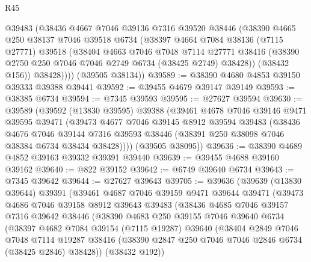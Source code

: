 \begin{lexlean}{R45}
\begin{coremodule}
{          @39483
          (@38436
            @4667
            @7046
            @39136
            @7316
            @39520
            @38446
            (@38390
              @4665
              @250
              @38137
              @7046
              @39518
              @6734
              (@38397
                @4664
                @7084
                @38136
                (@7115 @27771)
                @39518
                (@38404
                  @4663
                  @7046
                  @7048
                  @7114
                  @27771
                  @38416
                  (@38390 @2750 @250 @7046 @7046 @2749 @6734 (@38425 @2749) @38428))
                (@38432 @156))
              @38428))))
      (@39505 @38134))
@39589 := @38390 @4680 @4853 @39150 @39333 @39388 @39441
@39592 := @39455 @4679 @39147 @39149
@39593 := @38385 @6734
@39594 := @7345 @39593
@39595 := @27627 @39594
@39630 := @39589
    (@39592
      (@13830 @39595)
      @39388
      (@39461
        @4678
        @7046
        @39146
        @9471
        @39595
        @39471
        (@39473
          @4677
          @7046
          @39145
          @8912
          @39594
          @39483
          (@38436
            @4676
            @7046
            @39144
            @7316
            @39593
            @38446
            (@38391 @250 @38098 @7046 @38384 @6734 @38434 @38428))))
      (@39505 @38095))
@39636 := @38390 @4689 @4852 @39163 @39332 @39391 @39440
@39639 := @39455 @4688 @39160 @39162
@39640 := @822 @39152
@39642 := @6749 @39640 @6734
@39643 := @7345 @39642
@39644 := @27627 @39643
@39705 := @39636
    (@39639
      (@13830 @39644)
      @39391
      (@39461
        @4687
        @7046
        @39159
        @9471
        @39644
        @39471
        (@39473
          @4686
          @7046
          @39158
          @8912
          @39643
          @39483
          (@38436
            @4685
            @7046
            @39157
            @7316
            @39642
            @38446
            (@38390
              @4683
              @250
              @39155
              @7046
              @39640
              @6734
              (@38397
                @4682
                @7084
                @39154
                (@7115 @19287)
                @39640
                (@38404
                  @2849
                  @7046
                  @7048
                  @7114
                  @19287
                  @38416
                  (@38390 @2847 @250 @7046 @7046 @2846 @6734 (@38425 @2846) @38428))
                (@38432 @192))
}
\end{coremodule}
\end{lexlean}
